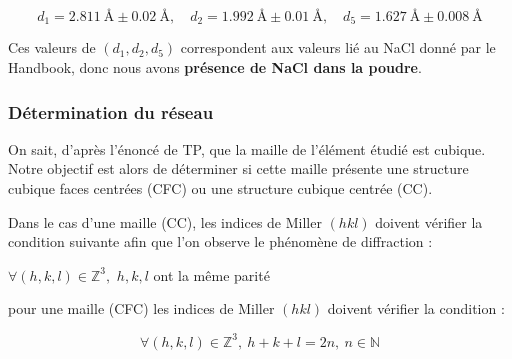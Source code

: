 \begin{equation}
	d_1 = 2.811 \ \text{Å} \pm 0.02 \ \text{Å}, \quad d_2 = 1.992 \ \text{Å} \pm 0.01 \ \text{Å}, \quad d_5 = 1.627 \ \text{Å} \pm 0.008 \ \text{Å}
\end{equation}

Ces valeurs de $(d_1, d_2, d_5)$ correspondent aux valeurs lié au NaCl donné par le Handbook, donc nous avons\textbf{ présence de NaCl dans la poudre}.

\subsubsection{Détermination du réseau}

\begin{flushleft}
	On sait, d'après l'énoncé de  TP, que la maille de l'élément étudié est cubique. Notre objectif est alors de déterminer si cette maille présente une structure cubique faces centrées (CFC) ou une structure cubique centrée (CC).
	
	
	Dans le cas d’une maille (CC), les indices de Miller $(h k l)$ doivent vérifier la condition
	suivante afin que l’on observe le phénomène de diffraction : 
	\begin{center} 
		$\forall (h,k,l)\in \mathbb{Z}^3,$  $h,k,l$ ont la même parité 
	\end{center}
	
	pour une  maille (CFC) les indices de Miller $(h k l)$ doivent vérifier la condition : 
	
	\begin{equation}
		\forall (h,k,l)\in \mathbb{Z}^3, \ 	h + k + l = 2n, \ n \in \mathbb{N}
	\end{equation}



\end{flushleft}
